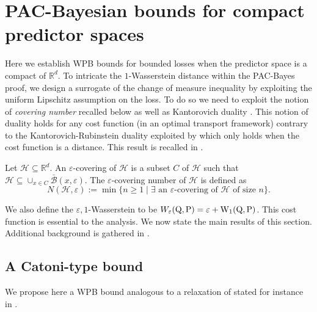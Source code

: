 \section{PAC-Bayesian bounds for compact predictor spaces}
\label{sec: compact_space}

Here we establish WPB bounds for bounded losses when the predictor space is a compact of $\mathbb{R}^d$. To intricate the $1$-Wasserstein distance within the PAC-Bayes proof, we design a surrogate of the change of measure inequality \citep{donsker1976asymp} by exploiting the uniform Lipschitz assumption on the loss. To do so we need to exploit the notion of \emph{covering number} recalled below as well as Kantorovich duality \citep[Theorem 5.10]{villani2009optimal}.
This notion of duality holds for any cost function (in an optimal transport framework) contrary to the Kantorovich-Rubinstein duality exploited by \citet{amit2022integral} which only holds when the cost function is a distance. This result is recalled in .
\begin{definition}
Let $\mathcal{H}\subseteq \mathbb{R}^d$. An $\varepsilon$-covering of $\mathcal{H}$ is a subset $C$ of $\mathcal{H}$ such that $\mathcal{H} \subseteq \cup_{x\in C} \bar{\mathcal{B}}(x,\varepsilon)$. The $\varepsilon$-covering number of $\mathcal{H}$ is defined as
$$N(\mathcal{H},\varepsilon):= \min\{n\geq 1 \mid \exists \text{ an $\varepsilon$-covering of $\mathcal{H}$ of size $n$} \}.$$
\end{definition}
We also define the $\varepsilon,1$-Wasserstein to be $W_{\varepsilon}(\mathrm{Q},\mathrm{P})= \varepsilon + \mathrm{W}_{1}(\mathrm{Q},\mathrm{P})$. This cost function is essential to the analysis.
We now state the main results of this section. Additional background is gathered in .

\subsection{A Catoni-type bound}

We propose here a WPB bound analogous to a relaxation of \citet[Theorem 1.2.6]{catoni2007pac} stated for instance in \citet[Theorem 4.1]{alquier2016properties}.

